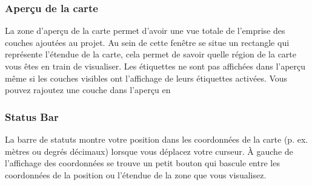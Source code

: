 \subsubsection{Aper\c{c}u de la carte}\label{label_mapoverview}

La zone d'aper\c{c}u de la carte permet d'avoir une vue totale de l'emprise des couches ajout\'ees au projet. Au sein de cette fen\^etre se situe un rectangle qui repr\'esente l'\'etendue de la carte, cela permet de savoir quelle r\'egion de la carte vous \^etes en train de visualiser. Les \'etiquettes ne sont pas affich\'ees dans l'aper\c{c}u m\^eme si les couches visibles ont l'affichage de leurs \'etiquettes activ\'ees.
Vous pouvez rajoutez une couche dans l'aper\c{c}u en

%
%
%

\subsubsection{Status Bar}\label{label_statusbar}

La barre de statuts montre votre position dans les coordonn\'ees de la carte (p. ex. m\`etres ou degr\'es d\'ecimaux) lorsque vous d\'eplacez votre curseur. \`A gauche de l'affichage des coordonn\'ees se trouve un petit bouton qui bascule entre les coordonn\'ees de la position ou l'\'etendue de la zone que vous visualisez.

